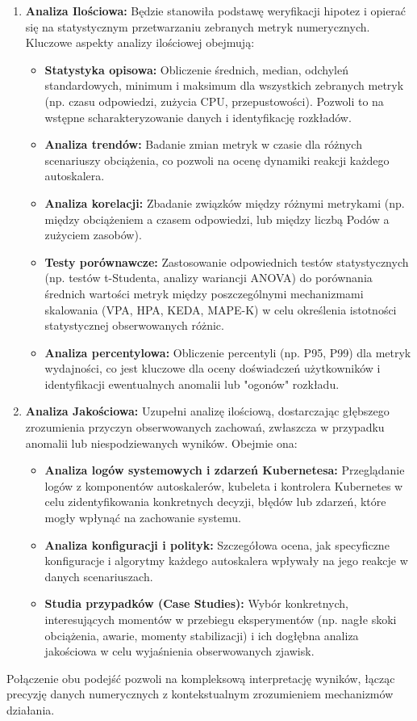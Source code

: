 \begin{enumerate}
    \item \textbf{Analiza Ilościowa:} Będzie stanowiła podstawę weryfikacji hipotez i opierać się na statystycznym przetwarzaniu zebranych metryk numerycznych. Kluczowe aspekty analizy ilościowej obejmują:
    \begin{itemize}
        \item \textbf{Statystyka opisowa:} Obliczenie średnich, median, odchyleń standardowych, minimum i maksimum dla wszystkich zebranych metryk (np. czasu odpowiedzi, zużycia CPU, przepustowości). Pozwoli to na wstępne scharakteryzowanie danych i identyfikację rozkładów.
        \item \textbf{Analiza trendów:} Badanie zmian metryk w czasie dla różnych scenariuszy obciążenia, co pozwoli na ocenę dynamiki reakcji każdego autoskalera.
        \item \textbf{Analiza korelacji:} Zbadanie związków między różnymi metrykami (np. między obciążeniem a czasem odpowiedzi, lub między liczbą Podów a zużyciem zasobów).
        \item \textbf{Testy porównawcze:} Zastosowanie odpowiednich testów statystycznych (np. testów t-Studenta, analizy wariancji ANOVA) do porównania średnich wartości metryk między poszczególnymi mechanizmami skalowania (VPA, HPA, KEDA, MAPE-K) w celu określenia istotności statystycznej obserwowanych różnic.
        \item \textbf{Analiza percentylowa:} Obliczenie percentyli (np. P95, P99) dla metryk wydajności, co jest kluczowe dla oceny doświadczeń użytkowników i identyfikacji ewentualnych anomalii lub "ogonów" rozkładu.
    \end{itemize}
    \item \textbf{Analiza Jakościowa:} Uzupełni analizę ilościową, dostarczając głębszego zrozumienia przyczyn obserwowanych zachowań, zwłaszcza w przypadku anomalii lub niespodziewanych wyników. Obejmie ona:
    \begin{itemize}
        \item \textbf{Analiza logów systemowych i zdarzeń Kubernetesa:} Przeglądanie logów z komponentów autoskalerów, kubeleta i kontrolera Kubernetes w celu zidentyfikowania konkretnych decyzji, błędów lub zdarzeń, które mogły wpłynąć na zachowanie systemu.
        \item \textbf{Analiza konfiguracji i polityk:} Szczegółowa ocena, jak specyficzne konfiguracje i algorytmy każdego autoskalera wpływały na jego reakcje w danych scenariuszach.
        \item \textbf{Studia przypadków (Case Studies):} Wybór konkretnych, interesujących momentów w przebiegu eksperymentów (np. nagłe skoki obciążenia, awarie, momenty stabilizacji) i ich dogłębna analiza jakościowa w celu wyjaśnienia obserwowanych zjawisk.
    \end{itemize}
\end{enumerate}
Połączenie obu podejść pozwoli na kompleksową interpretację wyników, łącząc precyzję danych numerycznych z kontekstualnym zrozumieniem mechanizmów działania.

